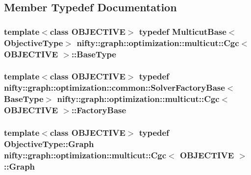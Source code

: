 \subsection{Member Typedef Documentation}
\hypertarget{classnifty_1_1graph_1_1optimization_1_1multicut_1_1Cgc_aa973cf9cceaa9e15ea351036f3c81fdf}{}
\subsubsection[{Base\+Type}]{\setlength{\rightskip}{0pt plus 5cm}template$<$class O\+B\+J\+E\+C\+T\+I\+V\+E$>$ typedef {\bf Multicut\+Base}$<${\bf Objective\+Type}$>$ {\bf nifty\+::graph\+::optimization\+::multicut\+::\+Cgc}$<$ O\+B\+J\+E\+C\+T\+I\+V\+E $>$\+::{\bf Base\+Type}}\label{classnifty_1_1graph_1_1optimization_1_1multicut_1_1Cgc_aa973cf9cceaa9e15ea351036f3c81fdf}
\hypertarget{classnifty_1_1graph_1_1optimization_1_1multicut_1_1Cgc_af4275240831bf3922200609cab98fc1b}{}
\subsubsection[{Factory\+Base}]{\setlength{\rightskip}{0pt plus 5cm}template$<$class O\+B\+J\+E\+C\+T\+I\+V\+E$>$ typedef {\bf nifty\+::graph\+::optimization\+::common\+::\+Solver\+Factory\+Base}$<${\bf Base\+Type}$>$ {\bf nifty\+::graph\+::optimization\+::multicut\+::\+Cgc}$<$ O\+B\+J\+E\+C\+T\+I\+V\+E $>$\+::{\bf Factory\+Base}}\label{classnifty_1_1graph_1_1optimization_1_1multicut_1_1Cgc_af4275240831bf3922200609cab98fc1b}
\hypertarget{classnifty_1_1graph_1_1optimization_1_1multicut_1_1Cgc_a4737d533c9d4d62c220bb81f5acba0fe}{}
\subsubsection[{Graph}]{\setlength{\rightskip}{0pt plus 5cm}template$<$class O\+B\+J\+E\+C\+T\+I\+V\+E$>$ typedef Objective\+Type\+::\+Graph {\bf nifty\+::graph\+::optimization\+::multicut\+::\+Cgc}$<$ O\+B\+J\+E\+C\+T\+I\+V\+E $>$\+::{\bf Graph}}\label{classnifty_1_1graph_1_1optimization_1_1multicut_1_1Cgc_a4737d533c9d4d62c220bb81f5acba0fe}
\hypertarget{classnifty_1_1graph_1_1optimization_1_1multicut_1_1Cgc_a7954c621d6b0085dac0a0208e8edeb98}{}
